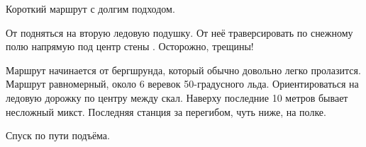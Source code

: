 Короткий маршрут с долгим подходом.

От  подняться на вторую ледовую
подушку. От неё траверсировать по снежному полю напрямую под центр
стены \geoPeakIzyskatel. Осторожно, трещины!

Маршрут начинается от бергшрунда, который обычно довольно легко
пролазится. Маршрут равномерный, около 6 веревок 50-градусного льда.
Ориентироваться на ледовую дорожку по центру между скал. Наверху
последние 10 метров бывает несложный микст. Последняя станция за
перегибом, чуть ниже, на полке.

Спуск по пути подъёма.

